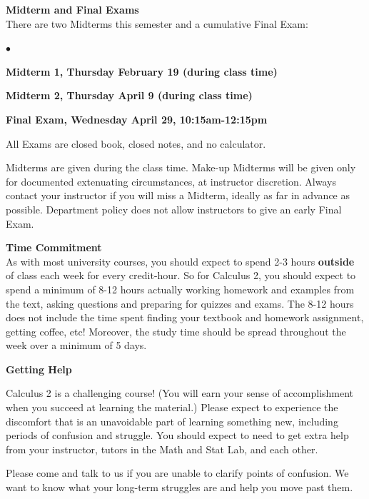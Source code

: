 \documentclass[12pt]{article}
\renewcommand{\emph}[1]{\textsf{\textbf{#1}}}
\newcommand{\localhead}[1]{\par\smallskip\textbf{#1} \smallskip\nobreak\\}%
\def\heading#1{\localhead{\large\emph{#1}}}
\newenvironment{clist}%
{\bgroup\parskip 0pt\begin{list}{$\bullet$}{\partopsep 4pt\topsep 0pt\itemsep -2pt}}%
{\end{list}\egroup}%
\begin{document}
\clearpage\newpage
\phantom{x}
\vspace{-4mm}

\heading{Midterm and Final Exams}
There are two Midterms this semester and a cumulative Final Exam:

\begin{clist}
\item \emph{Midterm 1, Thursday February 19 (during class time)}
\item \emph{Midterm 2, Thursday April 9 (during class time)}
\item  \emph{Final Exam, Wednesday April 29, 10:15am-12:15pm}
\end{clist} 

All Exams are closed book, closed notes, and no calculator.

Midterms are given during the class time. Make-up Midterms will be given only for documented extenuating circumstances, at instructor discretion. Always contact your instructor if you will miss a Midterm, ideally as far in advance as possible.  Department policy does not allow instructors to give an early Final Exam.

\heading{Time Commitment}

\vspace*{-.3in}
As with most university courses, you should expect to spend 2-3 hours \textbf{outside} of class each week for every credit-hour. So for Calculus 2, you should expect to spend a minimum of 8-12 hours actually working homework and examples from the text, asking questions and preparing for quizzes and exams. The 8-12 hours does not include the time spent finding your textbook and homework assignment, getting coffee, etc! Moreover, the study time should be spread throughout the week over a minimum of 5 days.

\heading{Getting Help}
\vspace*{-.3in}

Calculus 2 is a challenging course!  (You will earn your sense of accomplishment when you succeed at learning the material.)  Please expect to experience the discomfort that is an unavoidable part of learning something new, including periods of confusion and struggle. You should expect to need to get extra help from your instructor, tutors in the Math and Stat Lab, and each other. 

Please come and talk to us if you are unable to clarify points of confusion. We want to know what your long-term struggles are and help you move past them.
\end{document}
